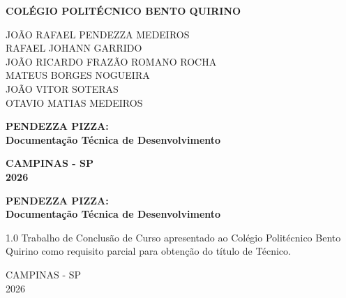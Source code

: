 \documentclass[12pt, a4paper]{article}
\begin{document}
\begin{titlepage}
    \begin{center}
        \textbf{COLÉGIO POLITÉCNICO BENTO QUIRINO}
        
        \vspace{3.5cm}
        
        JOÃO RAFAEL PENDEZZA MEDEIROS \\
        RAFAEL JOHANN GARRIDO \\
        JOÃO RICARDO FRAZÃO ROMANO ROCHA \\
        MATEUS BORGES NOGUEIRA \\
        JOÃO VITOR SOTERAS \\
        OTAVIO MATIAS MEDEIROS
        
        \vspace{4.5cm}
        
        \textbf{\large PENDEZZA PIZZA: \\ Documentação Técnica de Desenvolvimento}
        
        \vfill
        
        \textbf{CAMPINAS - SP} \\
        \textbf{2026}
    \end{center}
\end{titlepage}

\begin{titlepage}
    \begin{center}       
        \textbf{\large PENDEZZA PIZZA: \\ Documentação Técnica de Desenvolvimento}
        
        \vspace{2cm}
        
        \hspace{.45\textwidth}
        \begin{minipage}{.5\textwidth}
            \begin{spacing}{1.0}
                \small Trabalho de Conclusão de Curso apresentado ao Colégio Politécnico Bento Quirino como requisito parcial para obtenção do título de Técnico.
            \end{spacing}
        \end{minipage}
        
        \vfill
        
        CAMPINAS - SP \\
        2026
    \end{center}
\end{titlepage}
\end{document}
